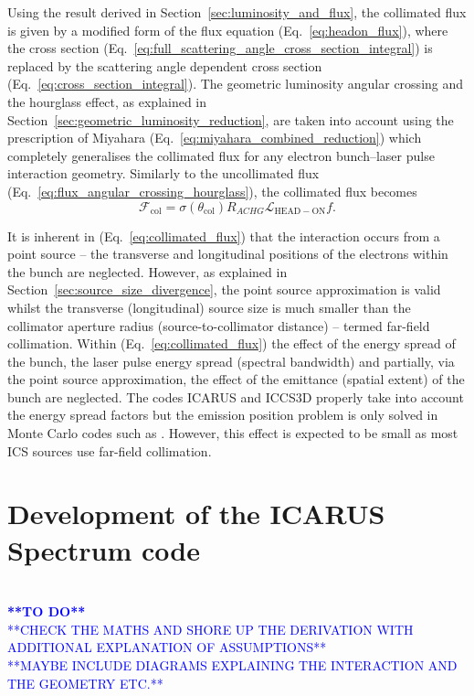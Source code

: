 \documentclass[../main.tex]{subfiles}
\begin{document}
Using the result derived in Section~\ref{sec:luminosity_and_flux}, the collimated flux is given by a modified form of the flux equation (Eq.~\ref{eq:headon_flux}), where the cross section (Eq.~\ref{eq:full_scattering_angle_cross_section_integral}) is replaced by the scattering angle dependent cross section (Eq.~\ref{eq:cross_section_integral}). The geometric luminosity angular crossing and the  hourglass effect, as explained in Section~\ref{sec:geometric_luminosity_reduction}, are taken into account using the prescription of Miyahara (Eq.~\ref{eq:miyahara_combined_reduction}) which completely generalises the collimated flux for any electron bunch--laser pulse interaction geometry. Similarly to  the uncollimated flux (Eq.~\ref{eq:flux_angular_crossing_hourglass}), the collimated flux becomes
\begin{equation}
\mathcal{F}_{\mathrm{col}} = \sigma\left(\theta_{\mathrm{col}}\right) R_{ACHG}\mathcal{L}_{\mathrm{HEAD-ON}}f.
\label{eq:collimated_flux}
\end{equation}

It is inherent in (Eq.~\ref{eq:collimated_flux}) that the interaction occurs from a point source -- the transverse and longitudinal positions of the electrons within the bunch are neglected. However, as explained in Section~\ref{sec:source_size_divergence}, the point source approximation is valid whilst the transverse (longitudinal) source size is much smaller than the collimator aperture radius (source-to-collimator distance) -- termed far-field collimation. Within (Eq.~\ref{eq:collimated_flux}) the effect of the energy spread of the bunch, the laser pulse energy spread (spectral bandwidth) and partially, via the point source approximation, the effect of the emittance (spatial extent) of the bunch are neglected. The codes \textsc{ICARUS} and \textsc{ICCS3D} \cite{krafft2016laser,ranjan2018simulation} properly take into account the energy spread factors but the emission position problem is only solved in Monte Carlo codes such as  \cite{chen1995cain}. However, this effect is expected to be small as most ICS sources use far-field collimation.

\section{Development of the ICARUS Spectrum code}
\label{sec:development_of_the_ICARUS_spectrum_code}

\textcolor{blue}{\\\textbf{**TO DO**}\\ **CHECK THE MATHS AND SHORE UP THE DERIVATION WITH ADDITIONAL EXPLANATION OF ASSUMPTIONS**\\ **MAYBE INCLUDE DIAGRAMS EXPLAINING THE INTERACTION AND THE GEOMETRY ETC.**}  
\end{document}
